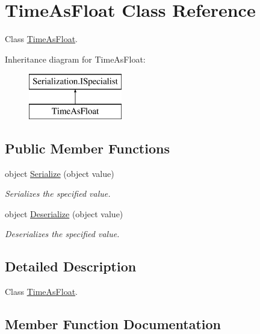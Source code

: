 \hypertarget{class_time_as_float}{}\section{Time\+As\+Float Class Reference}
\label{class_time_as_float}


Class \hyperlink{class_time_as_float}{Time\+As\+Float}.  


Inheritance diagram for Time\+As\+Float\+:\begin{figure}[H]
\begin{center}
\leavevmode
\includegraphics[height=2.000000cm]{class_time_as_float}
\end{center}
\end{figure}
\subsection*{Public Member Functions}
\begin{DoxyCompactItemize}
\item 
object \hyperlink{class_time_as_float_a2c67f320572b03fa73fbdd206d7fe65f}{Serialize} (object value)
\begin{DoxyCompactList}\small\item\em Serializes the specified value. \end{DoxyCompactList}\item 
object \hyperlink{class_time_as_float_a5f464ebb741e90aae50b8fdffe49b022}{Deserialize} (object value)
\begin{DoxyCompactList}\small\item\em Deserializes the specified value. \end{DoxyCompactList}\end{DoxyCompactItemize}


\subsection{Detailed Description}
Class \hyperlink{class_time_as_float}{Time\+As\+Float}. 



\subsection{Member Function Documentation}
\mbox{\label{class_time_as_float_a5f464ebb741e90aae50b8fdffe49b022}} 
